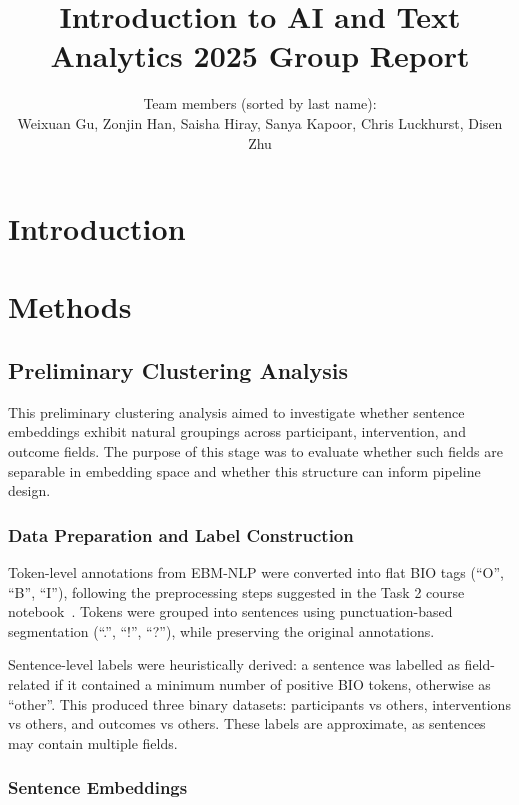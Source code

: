 \documentclass[11pt]{article}
\title{Introduction to AI and Text Analytics 2025 Group Report}
\author{
Team members (sorted by last name): \\
Weixuan Gu, Zonjin Han, Saisha Hiray, Sanya Kapoor, Chris Luckhurst, Disen Zhu
}
\begin{document}
\maketitle
\begin{abstract}



\end{abstract}

\section{Introduction}



\section{Methods}

\subsection{Preliminary Clustering Analysis}

This preliminary clustering analysis aimed to investigate whether sentence embeddings exhibit natural groupings across participant, intervention, and outcome fields. The purpose of this stage was to evaluate whether such fields are separable in embedding space and whether this structure can inform pipeline design.

\subsubsection{Data Preparation and Label Construction}

Token-level annotations from EBM-NLP were converted into flat BIO tags (“O”, “B”, “I”), following the preprocessing steps suggested in the Task 2 course notebook~\cite{uob_task2_notebook}. Tokens were grouped into sentences using punctuation-based segmentation (``.'', ``!'', ``?''), while preserving the original annotations.

Sentence-level labels were heuristically derived: a sentence was labelled as field-related if it contained a minimum number of positive BIO tokens, otherwise as “other”. This produced three binary datasets: participants vs others, interventions vs others, and outcomes vs others. These labels are approximate, as sentences may contain multiple fields.

\subsubsection{Sentence Embeddings}
\end{document}
